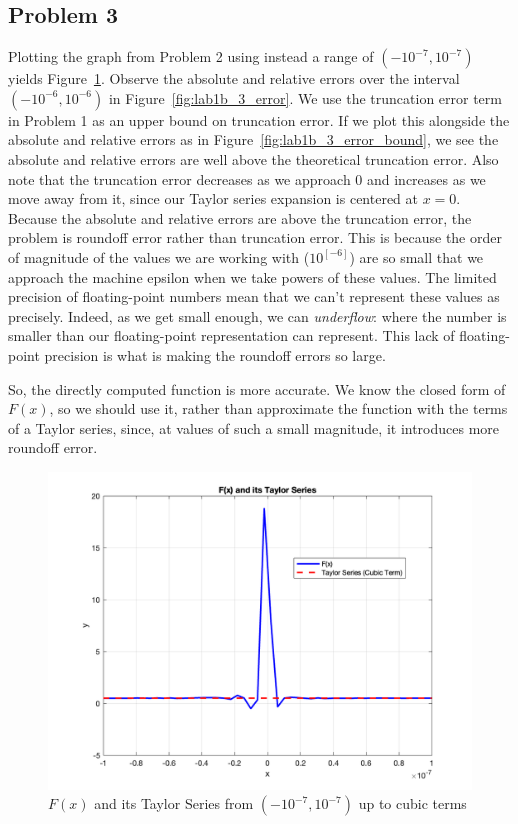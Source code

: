 \documentclass[letter,11pt]{article}
\begin{document}
\subsection{Problem 3}

Plotting the graph from Problem 2 using instead a range of $(-10^{-7}, 10^{-7})$ yields Figure~\ref{fig:lab1b_3}. Observe the absolute and relative errors over the interval $(-10^{-6}, 10^{-6})$ in Figure~\ref{fig:lab1b_3_error}. We use the truncation error term in Problem 1 as an upper bound on truncation error. If we plot this alongside the absolute and relative errors as in Figure~\ref{fig:lab1b_3_error_bound}, we see the absolute and relative errors are well above the theoretical truncation error. Also note that the truncation error decreases as we approach 0 and increases as we move away from it, since our Taylor series expansion is centered at $x = 0$. Because the absolute and relative errors are above the truncation error, the problem is roundoff error rather than truncation error. This is because the order of magnitude of the values we are working with ($10^[-6]$) are so small that we approach the machine epsilon when we take powers of these values. The limited precision of floating-point numbers mean that we can't represent these values as precisely. Indeed, as we get small enough, we can \textit{underflow}: where the number is smaller than our floating-point representation can represent. This lack of floating-point precision is what is making the roundoff errors so large.

So, the directly computed function is more accurate. We know the closed form of $F(x)$, so we should use it, rather than approximate the function with the terms of a Taylor series, since, at values of such a small magnitude, it introduces more roundoff error.

\begin{figure}[h]
  \centering
  \includegraphics[width=0.8\linewidth]{lab1b_3.png}
  \caption{$F(x)$ and its Taylor Series from $(-10^{-7}, 10^{-7})$ up to cubic terms}
  \label{fig:lab1b_3}
\end{figure}
\end{document}
